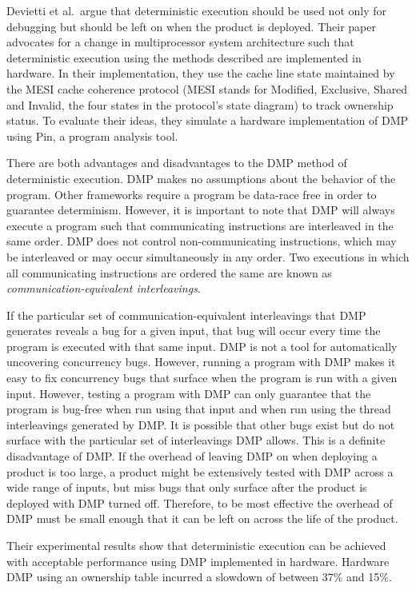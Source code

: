 Devietti et al.\ argue that deterministic execution should be used not
only for debugging but should be left on when the product is deployed.
Their paper advocates for a change in multiprocessor system
architecture such that deterministic execution using the methods
described are implemented in hardware.  In their implementation, they
use the cache line state maintained by the MESI cache coherence
protocol (MESI stands for Modified, Exclusive, Shared and Invalid, the
four states in the protocol's state diagram) to track ownership
status.  To evaluate their ideas, they simulate a hardware
implementation of DMP using Pin, a program analysis tool.

There are both advantages and disadvantages to the DMP method of
deterministic execution.  DMP makes no assumptions about the behavior
of the program.  Other frameworks require a program be data-race free
in order to guarantee determinism.  However, it is important to note
that DMP will always execute a program such that communicating
instructions are interleaved in the same order.  DMP does not control
non-communicating instructions, which may be interleaved or may occur
simultaneously in any order.  Two executions in which all
communicating instructions are ordered the same are known as
\emph{communication-equivalent interleavings}.

If the particular set of communication-equivalent interleavings that
DMP generates reveals a bug for a given input, that bug will occur
every time the program is executed with that same input.  DMP is not a
tool for automatically uncovering concurrency bugs.  However, running
a program with DMP makes it easy to fix concurrency bugs that surface
when the program is run with a given input.  However, testing a
program with DMP can only guarantee that the program is bug-free when
run using that input and when run using the thread interleavings
generated by DMP.  It is possible that other bugs exist but do not
surface with the particular set of interleavings DMP allows.  This is
a definite disadvantage of DMP.  If the overhead of leaving DMP on
when deploying a product is too large, a product might be extensively
tested with DMP across a wide range of inputs, but miss bugs that only
surface after the product is deployed with DMP turned off.  Therefore,
to be most effective the overhead of DMP must be small enough that it
can be left on across the life of the product.

Their experimental results show that deterministic execution can be
achieved with acceptable performance using DMP implemented in
hardware.  Hardware DMP using an ownership table incurred a slowdown
of between 37\% and 15\%.

